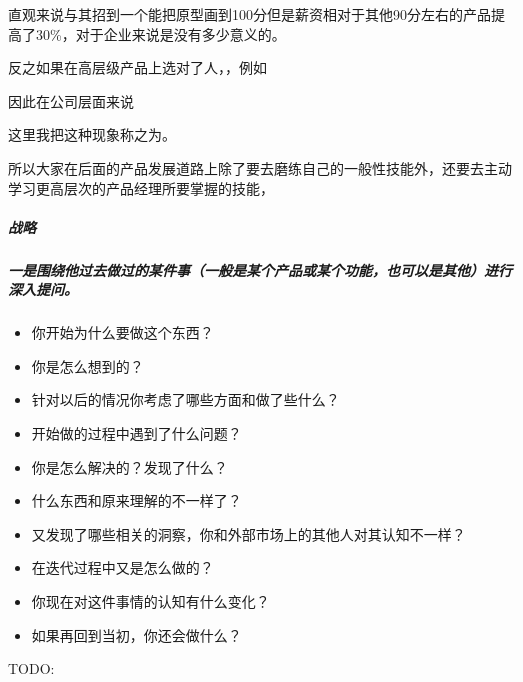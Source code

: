 \documentclass[letterpaper,10pt,english]{sphinxmanual}
\begin{document}
直观来说与其招到一个能把原型画到100分但是薪资相对于其他90分左右的产品提高了30\%，对于企业来说是没有多少意义的。

反之如果在高层级产品上选对了人，，例如

因此在公司层面来说

这里我把这种现象称之为。

所以大家在后面的产品发展道路上除了要去磨练自己的一般性技能外，还要去主动学习更高层次的产品经理所要掌握的技能，


\subparagraph{战略}
\label{\detokenize{chapter_interview/question:id9}}

\subparagraph{一是围绕他过去做过的某件事（一般是某个产品或某个功能，也可以是其他）进行深入提问。}
\label{\detokenize{chapter_interview/question:id10}}\begin{itemize}
\item {} 
你开始为什么要做这个东西？

\item {} 
你是怎么想到的？

\item {} 
针对以后的情况你考虑了哪些方面和做了些什么？

\item {} 
开始做的过程中遇到了什么问题？

\item {} 
你是怎么解决的？发现了什么？

\item {} 
什么东西和原来理解的不一样了？

\item {} 
又发现了哪些相关的洞察，你和外部市场上的其他人对其认知不一样？

\item {} 
在迭代过程中又是怎么做的？

\item {} 
你现在对这件事情的认知有什么变化？

\item {} 
如果再回到当初，你还会做什么？

\end{itemize}

TODO: 
\end{document}
